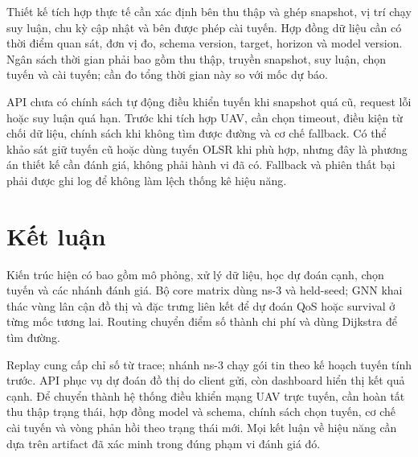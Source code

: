\documentclass[12pt,a4paper]{article}
\begin{document}
Thiết kế tích hợp thực tế cần xác định bên thu thập và ghép snapshot, vị trí chạy suy luận, chu kỳ cập nhật và bên được phép cài tuyến. Hợp đồng dữ liệu cần có thời điểm quan sát, đơn vị đo, schema version, target, horizon và model version. Ngân sách thời gian phải bao gồm thu thập, truyền snapshot, suy luận, chọn tuyến và cài tuyến; cần đo tổng thời gian này so với mốc dự báo.

API chưa có chính sách tự động điều khiển tuyến khi snapshot quá cũ, request lỗi hoặc suy luận quá hạn. Trước khi tích hợp UAV, cần chọn timeout, điều kiện từ chối dữ liệu, chính sách khi không tìm được đường và cơ chế fallback. Có thể khảo sát giữ tuyến cũ hoặc dùng tuyến OLSR khi phù hợp, nhưng đây là phương án thiết kế cần đánh giá, không phải hành vi đã có. Fallback và phiên thất bại phải được ghi log để không làm lệch thống kê hiệu năng.

\section{Kết luận}
\label{sec:conclusion}

Kiến trúc hiện có bao gồm mô phỏng, xử lý dữ liệu, học dự đoán cạnh, chọn tuyến và các nhánh đánh giá. Bộ core matrix dùng ns-3 và held-seed; GNN khai thác vùng lân cận đồ thị và đặc trưng liên kết để dự đoán QoS hoặc survival ở từng mốc tương lai. Routing chuyển điểm số thành chi phí và dùng Dijkstra để tìm đường.

Replay cung cấp chỉ số từ trace; nhánh ns-3 chạy gói tin theo kế hoạch tuyến tính trước. API phục vụ dự đoán đồ thị do client gửi, còn dashboard hiển thị kết quả cạnh. Để chuyển thành hệ thống điều khiển mạng UAV trực tuyến, cần hoàn tất thu thập trạng thái, hợp đồng model và schema, chính sách chọn tuyến, cơ chế cài tuyến và vòng phản hồi theo trạng thái mới. Mọi kết luận về hiệu năng cần dựa trên artifact đã xác minh trong đúng phạm vi đánh giá đó.
\end{document}
